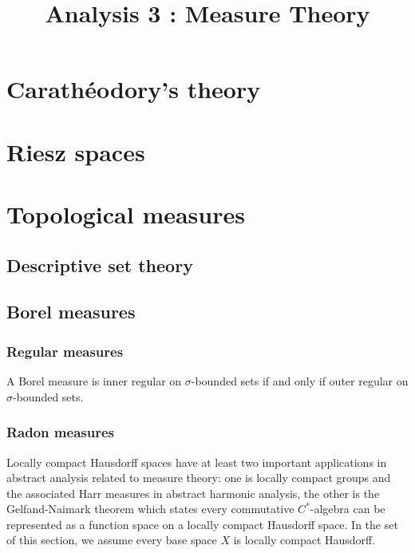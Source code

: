 \documentclass{../crs}
\title{Analysis 3 : Measure Theory}
\begin{document}
\maketitle
\tableofcontents

\chapter{Carath\'eodory's theory}


\chapter{Riesz spaces}



\chapter{Topological measures}

\section{Descriptive set theory}





\section{Borel measures}


\subsection{Regular measures}

\begin{thm}
A Borel measure is inner regular on $\sigma$-bounded sets if and only if outer regular on $\sigma$-bounded sets.
\end{thm}



\subsection{Radon measures}

Locally compact Hausdorff spaces have at least two important applications in abstract analysis related to measure theory: one is locally compact groups and the associated Harr measures in abstract harmonic analysis, the other is the Gelfand-Naimark theorem which states every commutative $C^*$-algebra can be represented as a function space on a locally compact Hausdorff space.
In the set of this section, we assume every base space $X$ is locally compact Hausdorff.
\end{document}
